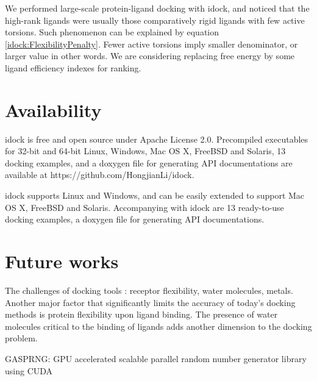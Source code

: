 We performed large-scale protein-ligand docking with idock, and noticed that the high-rank ligands were usually those comparatively rigid ligands with few active torsions. Such phenomenon can be explained by equation \eqref{idock:FlexibilityPenalty}. Fewer active torsions imply smaller denominator, or larger value in other words. We are considering replacing free energy by some ligand efficiency indexes \citep{335,336,337} for ranking.

\section{Availability}

idock is free and open source under Apache License 2.0. Precompiled executables for 32-bit and 64-bit Linux, Windows, Mac OS X, FreeBSD and Solaris, 13 docking examples, and a doxygen file for generating API documentations are available at https://github.com/HongjianLi/idock.

idock supports Linux and Windows, and can be easily extended to support Mac OS X, FreeBSD and Solaris. Accompanying with idock are 13 ready-to-use docking examples, a doxygen file for generating API documentations.

\section{Future works}

The challenges of docking tools \citep{493}: receptor flexibility, water molecules, metals. Another major factor that significantly limits the accuracy of today’s docking methods is protein flexibility upon ligand binding. The presence of water molecules critical to the binding of ligands adds another dimension to the docking problem.

\citep{1401} GASPRNG: GPU accelerated scalable parallel random number generator library using CUDA

